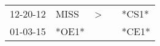 \begin{supertabular}{p{0.07\textwidth}p{0.06\textwidth}p{0.02\textwidth}p{0.02\textwidth}p{0.06\textwidth}}
 12-20-12\textsuperscript{} &  MISS\textsuperscript{} &  \textgreater &   &  *CS1* \\
 01-03-15\textsuperscript{} &                   *OE1* &               &   &  *CE1* \\
\end{supertabular}
